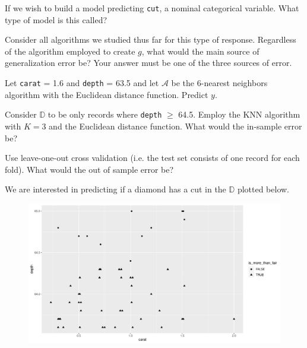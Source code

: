 \documentclass[12pt]{article}
\begin{document}
\benum

 If we wish to build a model predicting \texttt{cut}, a nominal categorical variable. What type of model is this called?

 Consider all algorithms we studied thus far for this type of response. Regardless of the algorithm employed to create $g$, what would the main source of generalization error be? Your answer must be one of the three sources of error.


 Let \texttt{carat} = 1.6 and \texttt{depth} = 63.5 and let $\mathcal{A}$ be the 6-nearest neighbors algorithm with the Euclidean distance function. Predict $y$.


Consider $\mathbb{D}$ to be only records where \texttt{depth} $\geq$ 64.5. Employ the KNN algorithm with $K=3$ and the Euclidean distance function. 
 What would the in-sample error be?


 Use leave-one-out cross validation (i.e. the test set consists of one record for each fold). What would the out of sample error be? 

\pagebreak

We are interested in predicting if a diamond has a cut  in the $\mathbb{D}$ plotted below.


\begin{figure}[htp]
\centering
\includegraphics[width=6.5in]{more_than_fair}
\end{figure}
\end{document}
